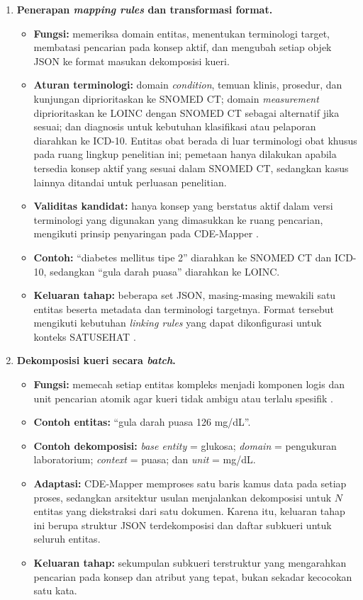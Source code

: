 \begin{enumerate}
    \item \textbf{Penerapan \textit{mapping rules} dan transformasi format.}
    \begin{itemize}
        \item \textbf{Fungsi:} memeriksa domain entitas, menentukan terminologi target, membatasi pencarian pada konsep aktif, dan mengubah setiap objek JSON ke format masukan dekomposisi kueri.
        \item \textbf{Aturan terminologi:} domain \textit{condition}, temuan klinis, prosedur, dan kunjungan diprioritaskan ke SNOMED CT; domain \textit{measurement} diprioritaskan ke LOINC dengan SNOMED CT sebagai alternatif jika sesuai; dan diagnosis untuk kebutuhan klasifikasi atau pelaporan diarahkan ke ICD-10. Entitas obat berada di luar terminologi obat khusus pada ruang lingkup penelitian ini; pemetaan hanya dilakukan apabila tersedia konsep aktif yang sesuai dalam SNOMED CT, sedangkan kasus lainnya ditandai untuk perluasan penelitian.
        \item \textbf{Validitas kandidat:} hanya konsep yang berstatus aktif dalam versi terminologi yang digunakan yang dimasukkan ke ruang pencarian, mengikuti prinsip penyaringan pada CDE-Mapper \citep{gilani_cde-mapper_2025}.
        \item \textbf{Contoh:} ``diabetes mellitus tipe 2'' diarahkan ke SNOMED CT dan ICD-10, sedangkan ``gula darah puasa'' diarahkan ke LOINC.
        \item \textbf{Keluaran tahap:} beberapa set JSON, masing-masing mewakili satu entitas beserta metadata dan terminologi targetnya. Format tersebut mengikuti kebutuhan \textit{linking rules} yang dapat dikonfigurasi untuk konteks SATUSEHAT \citep{ayuningtyas_bringing_2025}.
    \end{itemize}

    \Needspace{0.45\textheight}
    \item \textbf{Dekomposisi kueri secara \textit{batch}.}
    \begin{itemize}
        \item \textbf{Fungsi:} memecah setiap entitas kompleks menjadi komponen logis dan unit pencarian atomik agar kueri tidak ambigu atau terlalu spesifik \citep{gilani_cde-mapper_2025}.
        \item \textbf{Contoh entitas:} ``gula darah puasa 126 mg/dL''.
        \item \textbf{Contoh dekomposisi:} \textit{base entity} = glukosa; \textit{domain} = pengukuran laboratorium; \textit{context} = puasa; dan \textit{unit} = mg/dL.
        \item \textbf{Adaptasi:} CDE-Mapper memproses satu baris kamus data pada setiap proses, sedangkan arsitektur usulan menjalankan dekomposisi untuk $N$ entitas yang diekstraksi dari satu dokumen. Karena itu, keluaran tahap ini berupa struktur JSON terdekomposisi dan daftar subkueri untuk seluruh entitas.
        \item \textbf{Keluaran tahap:} sekumpulan subkueri terstruktur yang mengarahkan pencarian pada konsep dan atribut yang tepat, bukan sekadar kecocokan satu kata.
    \end{itemize}


\end{enumerate}
